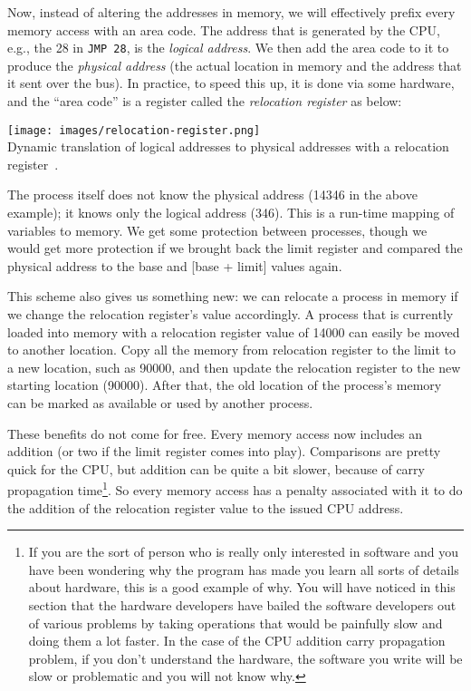 Now, instead of altering the addresses in memory, we will effectively prefix every memory access with an area code. The address that is generated by the CPU, e.g., the 28 in \texttt{JMP 28}, is the \textit{logical address}. We then add the area code to it to produce the \textit{physical address} (the actual location in memory and the address that it sent over the bus). In practice, to speed this up, it is done via some hardware, and the ``area code'' is a register called the \textit{relocation register} as below:

\begin{center}
\texttt{[image: images/relocation-register.png]}\\
Dynamic translation of logical addresses to physical addresses with a relocation register~\cite{osc}.
\end{center}

The process itself does not know the physical address (14346 in the above example); it knows only the logical address (346). This is a run-time mapping of variables to memory.  We get some protection between processes, though we would get more protection if we brought back the limit register and compared the physical address to the base and [base + limit] values again. 

This scheme also gives us something new: we can relocate a process in memory if we change the relocation register's value accordingly. A process that is currently loaded into memory with a relocation register value of 14000 can easily be moved to another location. Copy all the memory from relocation register to the limit to a new location, such as 90000, and then update the relocation register to the new starting location (90000). After that, the old location of the process's memory can be marked as available or used by another process.

These benefits do not come for free. Every memory access now includes an addition (or two if the limit register comes into play). Comparisons are pretty quick for the CPU, but addition can be quite a bit slower, because of carry propagation time\footnote{If you are the sort of person who is really only interested in software and you have been wondering why the program has made you learn all sorts of details about hardware, this is a good example of why. You will have noticed in this section that the hardware developers have bailed the software developers out of various problems by taking operations that would be painfully slow and doing them a lot faster. In the case of the CPU addition carry propagation problem, if you don't understand the hardware, the software you write will be slow or problematic and you will not know why.}. So every memory access has a penalty associated with it to do the addition of the relocation register value to the issued CPU address. 

